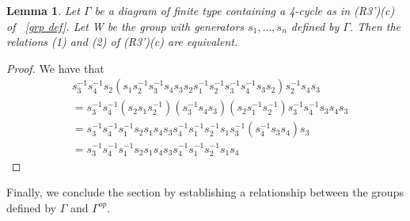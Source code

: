 \documentclass[11pt]{amsart}
\newtheorem{lem}[thm]{Lemma}
\theoremstyle{definition}
\begin{document}
\begin{lem} 
Let $\Gamma$ be a diagram of finite type containing a 4-cycle as in (R3')(c) of ~\ref{grp def}. Let W be the group with generators $s_{1}, \dots, s_{n}$ defined by $\Gamma$. Then the relations (1) and (2) of (R3')(c) are equivalent.
\end{lem}

\begin{proof}
We have that
\begin{align*}
& s_{3}^{-1}s_{4}^{-1}s_{2}(s_{1}s_{2}^{-1}s_{3}^{-1}s_{4}s_{3}s_{2}s_{1}^{-1}s_{2}^{-1}s_{3}^{-1}s_{4}^{-1}s_{3}s_{2})s_{2}^{-1}s_{4}s_{3} \\
&= s_{3}^{-1}s_{4}^{-1}(s_{2}s_{1}s_{2}^{-1})(s_{3}^{-1}s_{4}s_{3})(s_{2}s_{1}^{-1}s_{2}^{-1})s_{3}^{-1}s_{4}^{-1}s_{3}s_{4}s_{3} \\
&= s_{3}^{-1}s_{4}^{-1}s_{1}^{-1}s_{2}s_{1}s_{4}s_{3}s_{4}^{-1}s_{1}^{-1}s_{2}^{-1}s_{1}s_{3}^{-1}(s_{4}^{-1}s_{3}s_{4})s_{3} \\
&= s_{3}^{-1}s_{4}^{-1}s_{1}^{-1}s_{2}s_{1}s_{4}s_{3}s_{4}^{-1}s_{1}^{-1}s_{2}^{-1}s_{1}s_{4}
\end{align*}
\end{proof}

Finally, we conclude the section by establishing a relationship between the groups defined by $\Gamma$ and $\Gamma^{op}$.
\end{document}
